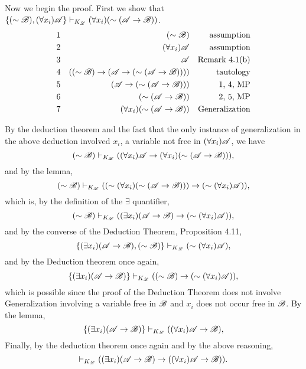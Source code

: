 \begin{enumerate}
\begin{enumerate}
          Now we begin the proof. First we show that \(\{(\sim\mathscr{B}), (\forall x_i)\mathscr{A}\} \vdash_{K_{\mathscr{L}}} (\forall x_i)(\sim(\mathscr{A} \rightarrow \mathscr{B}))\).
          \begin{align*}
            \text{1}&&
            (\sim\mathscr{B})&&
            \text{assumption}\\
            \text{2}&&
            (\forall x_i)\mathscr{A}&&
            \text{assumption}\\
            \text{3}&&
            \mathscr{A}&&
            \text{Remark 4.1(b)}\\
            \text{4}&&
            ((\sim\mathscr{B}) \rightarrow (\mathscr{A} \rightarrow (\sim(\mathscr{A} \rightarrow \mathscr{B}))))&&
            \text{tautology}\\
            \text{5}&&
            (\mathscr{A} \rightarrow (\sim(\mathscr{A} \rightarrow \mathscr{B})))&&
            \text{1, 4, MP}\\
            \text{6}&&
            (\sim(\mathscr{A} \rightarrow \mathscr{B}))&&
            \text{2, 5, MP}\\
            \text{7}&&
            (\forall x_i)(\sim(\mathscr{A} \rightarrow \mathscr{B}))&&
            \text{Generalization}
          \end{align*}
          
          By the deduction theorem and the fact that the only instance of generalization in the above deduction involved \(x_i\), a variable not free in \((\forall x_i)\mathscr{A}\), we have
          \[(\sim\mathscr{B}) \vdash_{K_{\mathscr{L}}} ((\forall x_i) \mathscr{A} \rightarrow (\forall x_i)(\sim(\mathscr{A} \rightarrow \mathscr{B}))),\]
          and by the lemma,
          \[(\sim\mathscr{B}) \vdash_{K_{\mathscr{L}}} ((\sim(\forall x_i)(\sim(\mathscr{A} \rightarrow \mathscr{B}))) \rightarrow (\sim(\forall x_i) \mathscr{A})),\]
          which is, by the definition of the \(\exists\) quantifier,
          \[(\sim\mathscr{B}) \vdash_{K_{\mathscr{L}}} ((\exists x_i)(\mathscr{A} \rightarrow \mathscr{B}) \rightarrow (\sim(\forall x_i) \mathscr{A})),\]
          and by the converse of the Deduction Theorem, Proposition 4.11,
          \[\{(\exists x_i)(\mathscr{A} \rightarrow \mathscr{B}), (\sim\mathscr{B})\} \vdash_{K_{\mathscr{L}}} (\sim(\forall x_i) \mathscr{A}),\]
          and by the Deduction theorem once again,
          \[\{(\exists x_i)(\mathscr{A} \rightarrow \mathscr{B})\} \vdash_{K_{\mathscr{L}}} ((\sim\mathscr{B}) \rightarrow (\sim(\forall x_i) \mathscr{A})),\]
          which is possible since the proof of the Deduction Theorem does not involve Generalization involving a variable free in \(\mathscr{B}\) and \(x_i\) does not occur free in \(\mathscr{B}\). By the lemma,
          \[\{(\exists x_i)(\mathscr{A} \rightarrow \mathscr{B})\} \vdash_{K_{\mathscr{L}}} ((\forall x_i) \mathscr{A} \rightarrow \mathscr{B}),\]
          Finally, by the deduction theorem once again and by the above reasoning,
          \[\vdash_{K_{\mathscr{L}}} ((\exists x_i)(\mathscr{A} \rightarrow \mathscr{B}) \rightarrow ((\forall x_i) \mathscr{A} \rightarrow \mathscr{B})).\]


\end{enumerate}
\end{enumerate}
